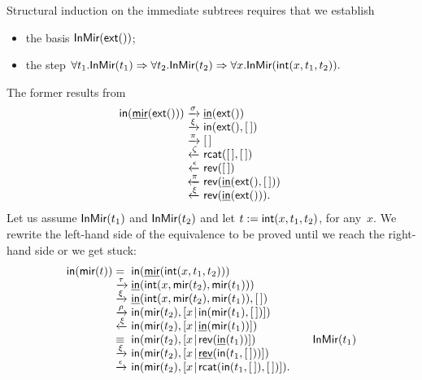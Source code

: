 \noindent Structural induction on the immediate subtrees requires that
we establish
\begin{itemize}

  \item the basis
  \(\textsf{InMir}({\textsf{ext}()})\);

  \item the step \(\forall t_1.\textsf{InMir}({t_1}) \Rightarrow \forall
    t_2.\textsf{InMir}({t_2}) \Rightarrow \forall
    x.\textsf{InMir}({\textsf{int}(x,t_1,t_2)}).\)

\end{itemize}
The former results from
\begin{equation*}
\begin{array}{@{}r@{\;}c@{\;}l@{\qquad}}
  \fun{in}(\ufun{mir}(\fun{ext}()))
  & \xrightarrow{\smash{\sigma}}
  & \ufun{in}(\fun{ext}())\\
  & \xrightarrow{\smash{\xi}}
  & \fun{in}(\fun{ext}(),\el)\\
  & \xrightarrow{\smash{\pi}}
  & \el\\
  & \xleftarrow{\smash{\zeta}}
  & \fun{rcat}(\el,\el)\\
  & \xleftarrow{\smash{\epsilon}}
  & \fun{rev}(\el)\\
  & \xleftarrow{\smash{\pi}}
  & \fun{rev}(\ufun{in}(\fun{ext}(),\el))\\
  & \xleftarrow{\smash{\xi}}
  & \fun{rev}(\ufun{in}(\fun{ext}())).
  \index{rcat@\fun{rcat/2}}\index{rev@\fun{rev/1}}
\end{array}
\end{equation*}
Let us assume \(\textsf{InMir}({t_1})\) and \(\textsf{InMir}({t_2})\) and let
\(t := \textsf{int}(x,t_1,t_2)\), for any~\(x\). We rewrite the
left\hyp{}hand side of the equivalence to be proved until we reach the
right\hyp{}hand side or we get stuck:
\begin{equation*}
\begin{array}{@{}r@{\;}l@{\;}l@{\qquad}r@{}}
\fun{in}(\fun{mir}(t)) & = &
\fun{in}(\ufun{mir}(\fun{int}(x,t_1,t_2)))\\
& \xrightarrow{\smash{\tau}}
& \ufun{in}(\fun{int}(x,\fun{mir}(t_2),\fun{mir}(t_1)))\\
& \xrightarrow{\smash{\xi}}
& \ufun{in}(\fun{int}(x,\fun{mir}(t_2),\fun{mir}(t_1)),\el)\\
& \xrightarrow{\smash{\rho}}
& \fun{in}(\fun{mir}(t_2),\cons{x}{\fun{in}(\fun{mir}(t_1),\el)})\\
& \xleftarrow{\smash{\xi}}
& \fun{in}(\fun{mir}(t_2),\cons{x}{\ufun{in}(\fun{mir}(t_1))})\\
& \equiv
& \fun{in}(\fun{mir}(t_2),\cons{x}{\fun{rev}(\ufun{in}(t_1))})
& \IH{\pred{InMir}{t_1}}\\
& \xrightarrow{\smash{\xi}}
& \fun{in}(\fun{mir}(t_2),\cons{x}{\ufun{rev}(\fun{in}(t_1,\el))})\\
& \xrightarrow{\smash{\epsilon}}
& \fun{in}(\fun{mir}(t_2),\cons{x}{\fun{rcat}(\fun{in}(t_1,\el),\el)}).
\end{array}
\end{equation*}
